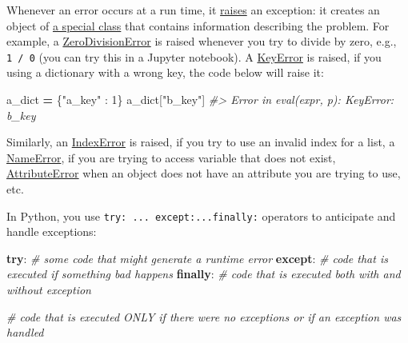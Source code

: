 \documentclass[
]{book}
\newenvironment{Shaded}{\begin{snugshade}}{\end{snugshade}}
\newcommand{\CommentTok}[1]{\textcolor[rgb]{0.56,0.35,0.01}{\textit{#1}}}
\newcommand{\ControlFlowTok}[1]{\textcolor[rgb]{0.13,0.29,0.53}{\textbf{#1}}}
\newcommand{\DecValTok}[1]{\textcolor[rgb]{0.00,0.00,0.81}{#1}}
\newcommand{\NormalTok}[1]{#1}
\newcommand{\OperatorTok}[1]{\textcolor[rgb]{0.81,0.36,0.00}{\textbf{#1}}}
\newcommand{\StringTok}[1]{\textcolor[rgb]{0.31,0.60,0.02}{#1}}
\begin{document}
Whenever an error occurs at a run time, it \href{https://docs.python.org/3/reference/simple_stmts.html\#the-raise-statement}{raises} an exception: it creates an object of \href{https://docs.python.org/3/library/exceptions.html\#concrete-exceptions}{a special class} that contains information describing the problem. For example, a \href{https://docs.python.org/3/library/exceptions.html\#ZeroDivisionError}{ZeroDivisionError} is raised whenever you try to divide by zero, e.g., \texttt{1\ /\ 0} (you can try this in a Jupyter notebook). A \href{https://docs.python.org/3/library/exceptions.html\#KeyError}{KeyError} is raised, if you using a dictionary with a wrong key, the code below will raise it:

\begin{Shaded}
\begin{Highlighting}[]
\NormalTok{a\_dict }\OperatorTok{=}\NormalTok{ \{}\StringTok{"a\_key"}\NormalTok{ : }\DecValTok{1}\NormalTok{\}}
\NormalTok{a\_dict[}\StringTok{"b\_key"}\NormalTok{]}
\CommentTok{\#\textgreater{} Error in eval(expr, p): KeyError: \textquotesingle{}b\_key\textquotesingle{}}
\end{Highlighting}
\end{Shaded}

Similarly, an \href{https://docs.python.org/3/library/exceptions.html\#IndexError}{IndexError} is raised, if you try to use an invalid index for a list, a \href{https://docs.python.org/3/library/exceptions.html\#NameError}{NameError}, if you are trying to access variable that does not exist, \href{https://docs.python.org/3/library/exceptions.html\#AttributeError}{AttributeError} when an object does not have an attribute you are trying to use, etc.

In Python, you use \texttt{try:\ ...\ except:...finally:} operators to anticipate and handle exceptions:

\begin{Shaded}
\begin{Highlighting}[]
\ControlFlowTok{try}\NormalTok{:}
    \CommentTok{\# some code that might generate a runtime error}
\ControlFlowTok{except}\NormalTok{:  }
    \CommentTok{\# code that is executed if something bad happens}
\ControlFlowTok{finally}\NormalTok{:}
    \CommentTok{\# code that is executed both with and without exception}
    
\CommentTok{\# code that is executed ONLY if there were no exceptions or if an exception was handled}
\end{Highlighting}
\end{Shaded}
\end{document}
